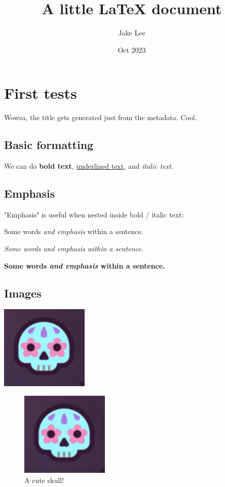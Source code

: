 \documentclass[12pt]{book}
\title{A little LaTeX document}
\author{Jake Lee}
\date{Oct 2023}
\begin{document}
\maketitle

\chapter{First tests}
Wowsa, the title gets generated just from the metadata. Cool.

\section{Basic formatting}
We can do \textbf{bold text}, \underline{underlined text}, and \textit{italic text}.

\section{Emphasis}
"Emphasis" is useful when nested inside bold / italic text:

Some words \emph{and emphasis} within a sentence.

\textit{Some words \emph{and emphasis} within a sentence.}

\textbf{Some words \emph{and emphasis} within a sentence.}

\section{Images}
\includegraphics{skull}

\begin{figure}
    \centering
    \includegraphics{skull}
    \caption{A cute skull!}
    \label{fig:skull}
\end{figure}
\end{document}
